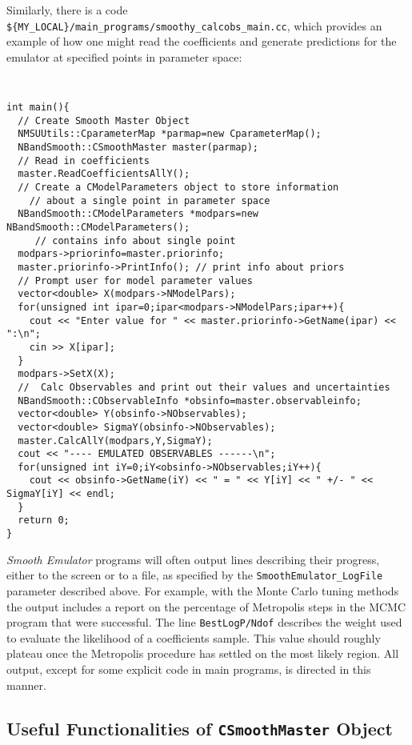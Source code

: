 \documentclass[UserManual.tex]{subfiles}
\begin{document}
Similarly, there is a code {\tt \$\{MY\_LOCAL\}/main\_programs/smoothy\_calcobs\_main.cc}, which provides an example of how one might read the coefficients and generate predictions for the emulator at specified points in parameter space:
{\tt
\begin{verbatim}
int main(){
  // Create Smooth Master Object
  NMSUUtils::CparameterMap *parmap=new CparameterMap();
  NBandSmooth::CSmoothMaster master(parmap);
  // Read in coefficients
  master.ReadCoefficientsAllY();
  // Create a CModelParameters object to store information
    // about a single point in parameter space
  NBandSmooth::CModelParameters *modpars=new NBandSmooth::CModelParameters();
     // contains info about single point
  modpars->priorinfo=master.priorinfo;
  master.priorinfo->PrintInfo(); // print info about priors
  // Prompt user for model parameter values
  vector<double> X(modpars->NModelPars);
  for(unsigned int ipar=0;ipar<modpars->NModelPars;ipar++){
    cout << "Enter value for " << master.priorinfo->GetName(ipar) << ":\n";
    cin >> X[ipar];
  }
  modpars->SetX(X);
  //  Calc Observables and print out their values and uncertainties
  NBandSmooth::CObservableInfo *obsinfo=master.observableinfo;
  vector<double> Y(obsinfo->NObservables);
  vector<double> SigmaY(obsinfo->NObservables);
  master.CalcAllY(modpars,Y,SigmaY);
  cout << "---- EMULATED OBSERVABLES ------\n";
  for(unsigned int iY=0;iY<obsinfo->NObservables;iY++){
    cout << obsinfo->GetName(iY) << " = " << Y[iY] << " +/- " << SigmaY[iY] << endl;
  }
  return 0;
}
\end{verbatim}
}

{\it Smooth Emulator} programs will often output lines describing their progress, either to the screen or to a file, as specified by the {\tt SmoothEmulator\_LogFile} parameter described above. For example, with the Monte Carlo tuning methods the output includes a report on the percentage of Metropolis steps in the MCMC program that were successful. The line {\tt BestLogP/Ndof} describes the weight used to evaluate the likelihood of a coefficients sample. This value should roughly plateau once the Metropolis procedure has settled on the most likely region. All output, except for some explicit code in main programs, is directed in this manner. 

\subsection{Useful Functionalities of {\tt CSmoothMaster} Object}
\end{document}
